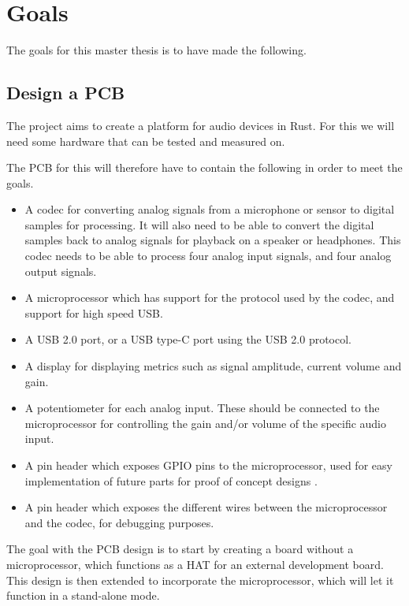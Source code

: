 \section{Goals}

The goals for this master thesis is to have made the following.

\subsection{Design a PCB}

The project aims to create a platform for audio devices in Rust. For this we will need some hardware 
that can be tested and measured on.

The PCB for this will therefore have to contain the following in order to meet the goals.

\begin{itemize}
	\item A codec for converting analog signals from a microphone or sensor to digital samples for
	processing. 
	It will also need to be able to convert the digital samples back to analog signals for playback 
	on a speaker or headphones.
	This codec needs to be able to process four analog input signals, and four analog output signals.
	\item A microprocessor which has support for the protocol used by the codec, and support for high 
	speed USB.
	\item A USB 2.0 port, or a USB type-C port using the USB 2.0 protocol.
	\item A display for displaying metrics such as signal amplitude, current volume and gain.
	\item A potentiometer for each analog input. These should be connected to the microprocessor for 
	controlling the gain and/or volume of the specific audio input.
	\item A pin header which exposes GPIO pins to the microprocessor, used for easy implementation of 
	future parts for proof of concept designs .
	\item A pin header which exposes the different wires between the microprocessor and the codec, 
	for debugging purposes.
\end{itemize}

The goal with the PCB design is to start by creating a board without a microprocessor, which functions 
as a HAT  for an external development board.
This design is then extended to incorporate the microprocessor, which will let it function in a 
stand-alone mode.

